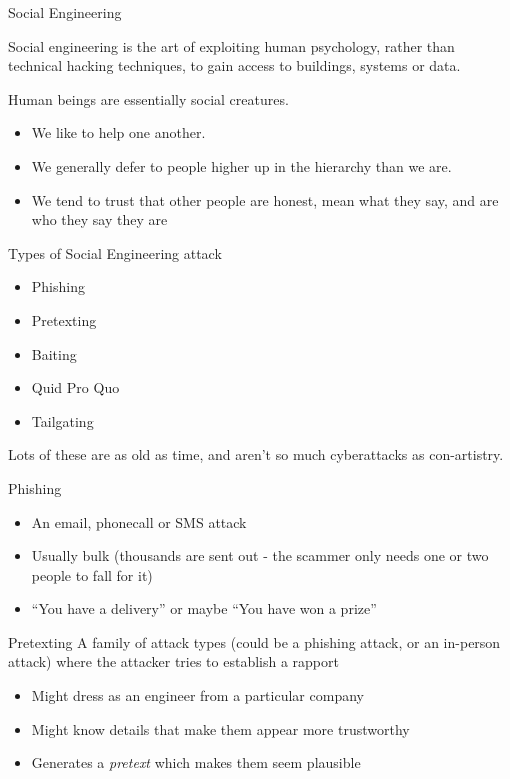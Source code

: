 \documentclass[xcolor=table]{beamer}
\begin{document}
\begin{frame}{Social Engineering}

Social engineering is the art of exploiting human psychology,
rather than technical hacking techniques, to gain access to
buildings, systems or data.

Human beings are essentially social creatures.

	\begin{itemize}
		\item We like to help one another.
		\item We generally defer to people higher up in the hierarchy than we are.  
		\item We tend to trust that other people are honest, mean what they say, and are who they say they are
	\end{itemize}
\end{frame}

\begin{frame}{Types of Social Engineering attack}
	\begin{itemize}
		\item Phishing
		\item Pretexting
		\item Baiting
		\item Quid Pro Quo
		\item Tailgating
	\end{itemize}
	Lots of these are as old as time, and aren't so much cyberattacks as con-artistry.
\end{frame}

\begin{frame}{Phishing}
	\begin{itemize}
		\item An email, phonecall or SMS attack
		\item Usually bulk (thousands are sent out - the scammer only needs one or two people to fall for it)
		\item ``You have a delivery'' or maybe ``You have won a prize''
	\end{itemize}
\end{frame}

\begin{frame}{Pretexting}
	A family of attack types (could be a phishing attack, or an in-person attack) where the attacker tries to establish a rapport
	\begin{itemize}
		\item Might dress as an engineer from a particular company
		\item Might know details that make them appear more trustworthy
		\item Generates a \emph{pretext} which makes them seem plausible
	\end{itemize}


\end{frame}
\end{document}
